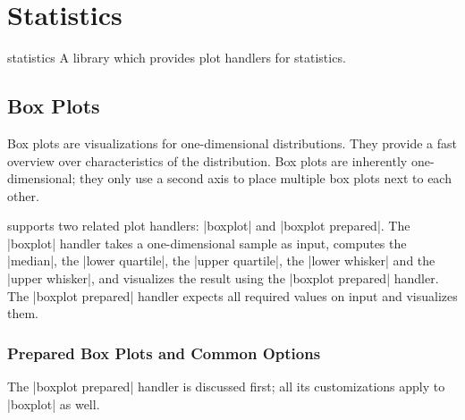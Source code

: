 
\section[libs.statistics]{Statistics}

\begingroup
\def\pgfplotsmanualcurlibrary{statistics}

\begin{pgfplotslibrary}{statistics}
    A library which provides plot handlers for statistics.
\end{pgfplotslibrary}


\subsection{Box Plots}
\label{sec:boxplots}

\begingroup

\oldgraykeyprefixes
{}%

Box plots are visualizations for one-dimensional distributions. They provide a
fast overview over characteristics of the distribution. Box plots are
inherently one-dimensional; they only use a second axis to place multiple box
plots next to each other.

\PGFPlots{} supports two related plot handlers: |boxplot| and
|boxplot prepared|. The |boxplot| handler takes a one-dimensional sample as
input, computes the |median|, the |lower quartile|, the |upper quartile|, the
|lower whisker| and the |upper whisker|, and visualizes the result using the
|boxplot prepared| handler. The |boxplot prepared| handler expects all required
values on input and visualizes them.


\subsubsection{Prepared Box Plots and Common Options}

The |boxplot prepared| handler is discussed first; all its customizations apply
to |boxplot| as well.


